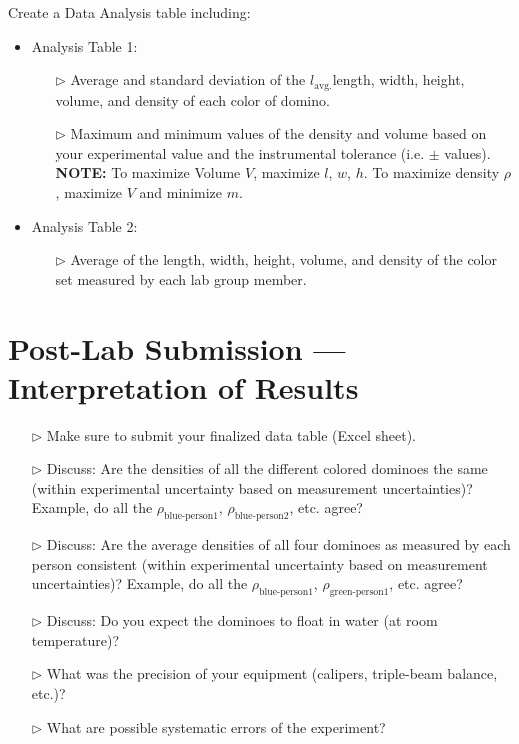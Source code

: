 \begin{enumerate}
Create a Data Analysis table including:  
\begin{itemize}
    \item Analysis Table 1:
    \begin{itemize}
    	\item[$\triangleright$] Average and standard deviation of the $l_\text{avg.}$length, width, height, volume, and density of each color of domino. 
	   \item[$\triangleright$] Maximum and minimum values of the density and volume based on your experimental value and the instrumental tolerance (i.e. $\pm$ values). \textbf{NOTE:} To maximize Volume $V$, maximize $l$, $w$, $h$. To maximize density $\rho$, maximize $V$ and minimize $m$.
    \end{itemize}
    \item Analysis Table 2:
    \begin{itemize}
        \item[$\triangleright$] Average of the length, width, height, volume, and density of the color set measured by each lab group member.  
    \end{itemize}
\end{itemize}

\end{enumerate}

\pagebreak

\section{Post-Lab Submission --- Interpretation of Results}

\begin{itemize}
    \item[$\triangleright$] Make sure to submit your finalized data table (Excel sheet).
	\item[$\triangleright$] Discuss: Are the densities of all the different colored dominoes the same (within experimental uncertainty based on measurement uncertainties)? Example, do all the $\rho_{\text{blue-person1}}$, $\rho_{\text{blue-person2}}$, etc. agree?
	\item[$\triangleright$] Discuss: Are the average densities of all four dominoes as measured by each person consistent (within experimental uncertainty based on measurement uncertainties)? Example, do all the $\rho_{\text{blue-person1}}$, $\rho_{\text{green-person1}}$, etc. agree?
	\item[$\triangleright$] Discuss: Do you expect the dominoes to float in water (at room temperature)?
    \item[$\triangleright$] What was the precision of your equipment (calipers, triple-beam balance, etc.)?
    \item[$\triangleright$] What are possible systematic errors of the experiment?
\end{itemize}

